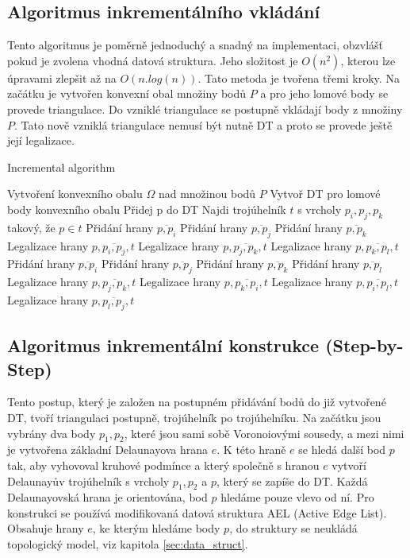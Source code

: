 \documentclass[12pt,a4paper]{article}
\begin{document}
{\newpage
\subsection{Algoritmus inkrementálního vkládání}
\label{subsec:Inc_alg}

Tento algoritmus je poměrně jednoduchý a snadný na implementaci,
obzvlášť pokud je zvolena vhodná datová struktura. Jeho složitost je
$O(n^2)$, kterou lze úpravami zlepšit až na $O(n.log(n))$. Tato
metoda je tvořena třemi kroky. Na začátku je vytvořen konvexní obal
množiny bodů $P$ a pro jeho lomové body se provede triangulace. Do
vzniklé triangulace se postupně vkládají body z množiny $P$. Tato nově
vzniklá triangulace nemusí být nutně DT a proto se provede ještě její
legalizace.

\begin{algorithm}
\caption{Incremental algorithm}
\begin{algorithmic}[1]
\State Vytvoření konvexního obalu $\Omega$ nad množinou bodů $P$
\State Vytvoř DT pro lomové body konvexního obalu
	\State Přidej p do DT
	\State Najdi trojúhelník $t$ s vrcholy $p_i, p_j, p_k$ takový, že $p \in t$
		\State Přidání hrany $\overline{p,p_i}$
		\State Přidání hrany $\overline{p,p_j}$
		\State Přidání hrany $\overline{p,p_k}$
		\State Legalizace hrany $p,\overline{p_i,p_j},t$
		\State Legalizace hrany $p,\overline{p_j,p_k},t$
		\State Legalizace hrany $p,\overline{p_k,p_l},t$
		\State Přidání hrany $\overline{p,p_i}$
		\State Přidání hrany $\overline{p,p_j}$
		\State Přidání hrany $\overline{p,p_k}$
		\State Přidání hrany $\overline{p,p_l}$
		\State Legalizace hrany $p,\overline{p_j,p_k},t$
		\State Legalizace hrany $p,\overline{p_k,p_i},t$
		\State Legalizace hrany $p,\overline{p_i,p_l},t$
		\State Legalizace hrany $p,\overline{p_l,p_j},t$
	\EndIf
\EndFor
\end{algorithmic}
\end{algorithm}

\newpage
\subsection{Algoritmus inkrementální konstrukce (Step-by-Step)}

Tento postup, který je založen na postupném přidávání bodů do již
vytvořené DT, tvoří triangulaci postupně, trojúhelník po
trojúhelníku. Na začátku jsou vybrány dva body $p_1, p_2$, které jsou
sami sobě Voronoiovými sousedy, a mezi nimi je vytvořena základní
Delaunayova hrana $e$. K této hraně $e$ se hledá další bod $p$ tak,
aby vyhovoval kruhové podmínce a který společně s hranou $e$ vytvoří
Delaunayův trojúhelník s vrcholy $p_1, p_2$ a $p$, který se zapíše do
DT. Každá Delaunayovská hrana je orientována, bod $p$ hledáme pouze
vlevo od ní. Pro konstrukci se používá modifikovaná datová struktura
AEL (Active Edge List). Obsahuje hrany $e$, ke kterým hledáme body
$p$, do struktury se neukládá topologický model, viz kapitola
\ref{sec:data_struct}.

}
\end{document}
